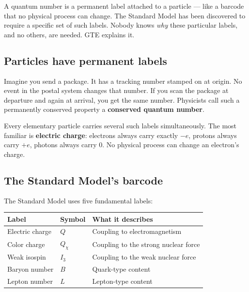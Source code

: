 \documentclass[11pt,a4paper]{article}
\newcommand{\term}[1]{\textbf{#1}}
\begin{document}
\begin{tcolorbox}[colback=boxblue,colframe=blue!40!black,
  title=The one-line answer]
A quantum number is a permanent label attached to a particle --- like a
barcode that no physical process can change.  The Standard Model has been
discovered to require a specific set of such labels.  Nobody knows
\emph{why} these particular labels, and no others, are needed.  GTE explains
it.
\end{tcolorbox}

\subsection{Particles have permanent labels}

Imagine you send a package.  It has a tracking number stamped on at origin.
No event in the postal system changes that number.  If you scan the package
at departure and again at arrival, you get the same number.  Physicists
call such a permanently conserved property a \term{conserved quantum number}.

Every elementary particle carries several such labels simultaneously.  The
most familiar is \term{electric charge}: electrons always carry exactly
$-e$, protons always carry $+e$, photons always carry $0$.  No physical
process can change an electron's charge.

\subsection{The Standard Model's barcode}

The Standard Model uses five fundamental labels:

\bigskip
\begin{center}
\begin{tabular}{lll}
\toprule
Label & Symbol & What it describes \\
\midrule
Electric charge & $Q$ & Coupling to electromagnetism \\
Color charge & $Q_\chi$ & Coupling to the strong nuclear force \\
Weak isospin & $I_3$ & Coupling to the weak nuclear force \\
Baryon number & $B$ & Quark-type content \\
Lepton number & $L$ & Lepton-type content \\
\bottomrule
\end{tabular}
\end{center}
\bigskip
\end{document}
